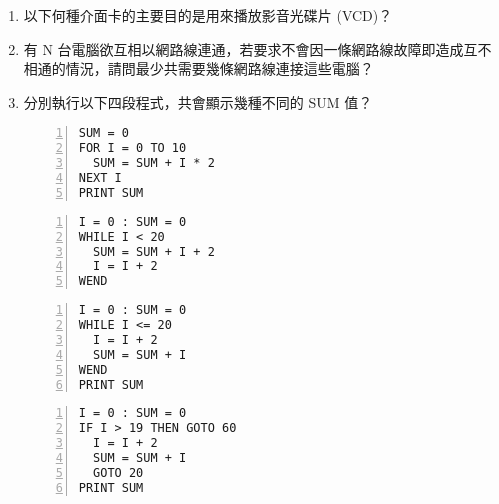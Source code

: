 \documentclass[12pt,a4paper]{report}
\begin{document}
\begin{CJK}{UTF8}{bkai}
\begin{enumerate}
\item 以下何種介面卡的主要目的是用來播放影音光碟片 (VCD)？
\item 有 N 台電腦欲互相以網路線連通，若要求不會因一條網路線故障即造成互不相通的情況，請問最少共需要幾條網路線連接這些電腦？
\item 分別執行以下四段程式，共會顯示幾種不同的 SUM 值？
  \begin{multicols}{2}
    \begin{lstlisting}[language={[Visual]Basic},numbers=left,title=$\langle$程式 1$\rangle$]
SUM = 0
FOR I = 0 TO 10
  SUM = SUM + I * 2
NEXT I
PRINT SUM
    \end{lstlisting}
    \begin{lstlisting}[language={[Visual]Basic},numbers=left,title=$\langle$程式 2$\rangle$]
I = 0 : SUM = 0
WHILE I < 20
  SUM = SUM + I + 2
  I = I + 2
WEND
    \end{lstlisting}
  \end{multicols}
  \begin{multicols}{2}
    \begin{lstlisting}[language={[Visual]Basic},numbers=left,title=$\langle$程式 3$\rangle$]
I = 0 : SUM = 0
WHILE I <= 20
  I = I + 2
  SUM = SUM + I
WEND
PRINT SUM
    \end{lstlisting}
    \begin{lstlisting}[language={[Visual]Basic},numbers=left,title=$\langle$程式 4$\rangle$]
I = 0 : SUM = 0
IF I > 19 THEN GOTO 60
  I = I + 2
  SUM = SUM + I
  GOTO 20
PRINT SUM
    \end{lstlisting}
  \end{multicols}
\end{enumerate}


\end{CJK}
\end{document}
